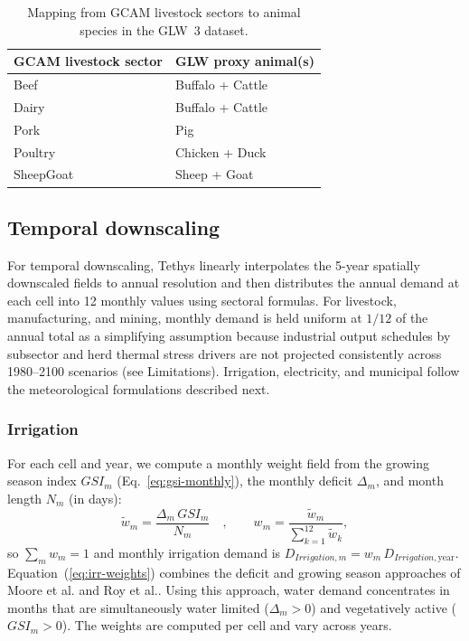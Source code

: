 \documentclass[fleqn,10pt]{wlscirep}
\begin{document}
\begin{table}[!ht]
\centering
\begin{tabular}{ll}
\toprule
\textbf{GCAM livestock sector} & \textbf{GLW proxy animal(s)} \\
\midrule
Beef      & Buffalo + Cattle \\
Dairy     & Buffalo + Cattle \\
Pork      & Pig \\
Poultry   & Chicken + Duck \\
SheepGoat & Sheep + Goat \\
\bottomrule
\end{tabular}
\caption{Mapping from GCAM livestock sectors to animal species in the GLW~3 dataset\cite{Gilbert2018}.}
\label{tab:livestock}
\end{table}

\subsection*{Temporal downscaling}

For temporal downscaling, Tethys linearly interpolates the 5-year spatially downscaled fields to annual resolution and then distributes the annual demand at each cell into 12 monthly values using sectoral formulas. For livestock, manufacturing, and mining, monthly demand is held uniform at $1/12$ of the annual total as a simplifying assumption because industrial output schedules by subsector and herd thermal stress drivers are not projected consistently across 1980--2100 scenarios\cite{Hou2024ESSD,Grogan2022GMD,LeRiche2017Water} (see Limitations). Irrigation, electricity, and municipal follow the meteorological formulations described next.

\subsubsection*{Irrigation}

For each cell and year, we compute a monthly weight field from the growing season index $GSI_m$ (Eq.~\ref{eq:gsi-monthly}), the monthly deficit $\Delta_m$, and month length $N_m$ (in days):
\begin{equation}
\tilde{w}_m = \frac{\Delta_m \, GSI_m}{N_m}\quad, \qquad w_m = \frac{\tilde{w}_m}{\sum_{k=1}^{12}\tilde{w}_k},
\label{eq:irr-weights}
\end{equation}
so $\sum_m w_m = 1$ and monthly irrigation demand is $D_{Irrigation,m} = w_m \, D_{Irrigation,\mathrm{year}}$. Equation~(\ref{eq:irr-weights}) combines the deficit and growing season approaches of Moore et al.\cite{Moore_2015} and Roy et al.\cite{Roy_2005}. Using this approach, water demand concentrates in months that are simultaneously water limited ($\Delta_m > 0$) and vegetatively active ($GSI_m > 0$). The weights are computed per cell and vary across years.
\end{document}

